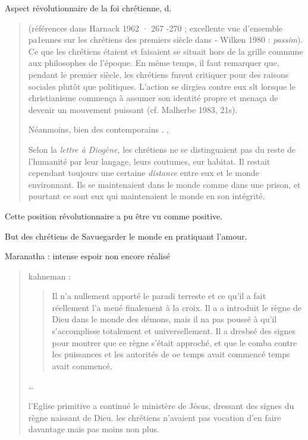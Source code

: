 Aspect révolutionnaire de la foi chrétienne, d. 
\begin{quote}
(références dans
    Harnack 1962 · 267 -270 ; excellente vue d'ensemble
pa1ennes sur les chrétiens   des premiers siècle dans - Wilken 1980 :
\textit{passim}). Ce que les chrétiens étaient et faisaient se situait hors de la grille commune aux philosophes de l'époque. En même temps, il faut 
remarquer que, pendant le premier siècle, les chrétiens furent critiquer 
pour des raisons sociales plutôt que politiques. L'action se dirgiea contre eux slt lorsque le christianisme commença à assumer son identité propre et menaça de devenir un mouvement puissant (cf. Malherbe 1983, 21s).

Néanmoins, bien des contemporains . ,
 
 
 Selon la \textit{lettre à Diogène, } les chrétiens ne se distinguaient pas du reste de l'humanité par leur langage, leurs coutumes, eur habitat. Il restait cependant toujours une certaine \textit{distance} entre eux et le monde environnant. Ils se maintenaient dans le monde comme dans une prison, et pourtant ce sont eux qui maintenaient le monde en son intégrité.
\end{quote}

Cette position révolutionnaire a pu être vu comme positive. 
\begin{Synthesis}
But des chrétiens de Savuegarder le monde en pratiquant l'amour. 

Maranatha : intense espoir non encore réalisé
\end{Synthesis}

\begin{quote} 
    kahneman : 
    \begin{quote}
    
    Il n'a nullement apporté le paradi terreste et ce qu'il a fait réellement l'a
mené finalement à la croix. Il a a introduit le règne de Dieu dans le monde 
des démons, mais il na pas poussé à qu'il s'accomplisse totalement et 
universellement. Il a dresbsé des signes pour montrer que ce règne s'était
approché, et que le comba contre les puissances et les autorités de oe
 temps avait commencé
temps avait commencé.
\end{quote}
 
 \ldots
 
 l'Eglise primitive a continué le ministère de Jésus, dressant des signes du règne naissant de Dieu. les chrétiens n'avaient pas vocation d'en faire davantage mais pas moins non plus.
\end{quote}


